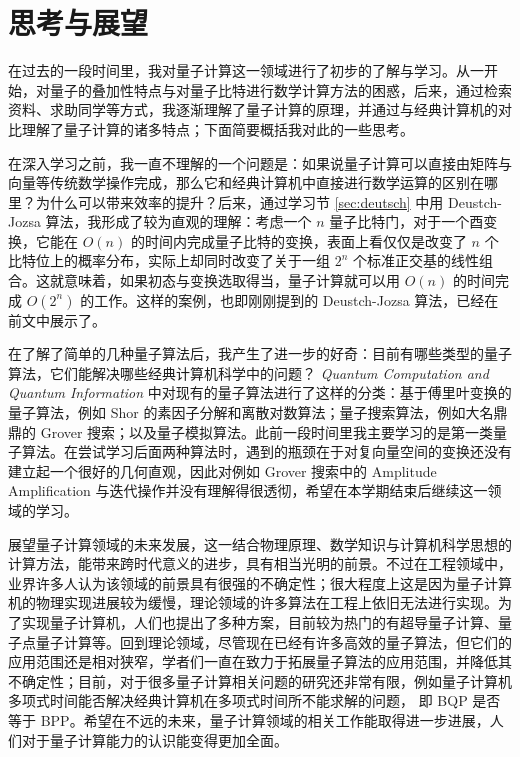 \section{思考与展望}

在过去的一段时间里，我对量子计算这一领域进行了初步的了解与学习。从一开始，对量子的叠加性特点与对量子比特进行数学计算方法的困惑，后来，通过检索资料、求助同学等方式，我逐渐理解了量子计算的原理，并通过与经典计算机的对比理解了量子计算的诸多特点；下面简要概括我对此的一些思考。

在深入学习之前，我一直不理解的一个问题是：如果说量子计算可以直接由矩阵与向量等传统数学操作完成，那么它和经典计算机中直接进行数学运算的区别在哪里？为什么可以带来效率的提升？后来，通过学习节 \ref{sec:deutsch} 中用 Deustch-Jozsa 算法，我形成了较为直观的理解：考虑一个 $n$ 量子比特门，对于一个酉变换，它能在 $O(n)$ 的时间内完成量子比特的变换，表面上看仅仅是改变了 $n$ 个比特位上的概率分布，实际上却同时改变了关于一组 $2^n$ 个标准正交基的线性组合。这就意味着，如果初态与变换选取得当，量子计算就可以用 $O(n)$ 的时间完成 $O(2^n)$ 的工作。这样的案例，也即刚刚提到的 Deustch-Jozsa 算法，已经在前文中展示了。

在了解了简单的几种量子算法后，我产生了进一步的好奇：目前有哪些类型的量子算法，它们能解决哪些经典计算机科学中的问题？\textit{ Quantum Computation and Quantum Information}\cite{nielsen2002quantum} 中对现有的量子算法进行了这样的分类：基于傅里叶变换的量子算法，例如 Shor 的素因子分解和离散对数算法；量子搜索算法，例如大名鼎鼎的 Grover 搜索；以及量子模拟算法。此前一段时间里我主要学习的是第一类量子算法。在尝试学习后面两种算法时，遇到的瓶颈在于对复向量空间的变换还没有建立起一个很好的几何直观，因此对例如 Grover 搜索中的 Amplitude Amplification 与迭代操作并没有理解得很透彻，希望在本学期结束后继续这一领域的学习。

展望量子计算领域的未来发展，这一结合物理原理、数学知识与计算机科学思想的计算方法，能带来跨时代意义的进步，具有相当光明的前景。不过在工程领域中，业界许多人认为该领域的前景具有很强的不确定性；很大程度上这是因为量子计算机的物理实现进展较为缓慢，理论领域的许多算法在工程上依旧无法进行实现。为了实现量子计算机，人们也提出了多种方案，目前较为热门的有超导量子计算、量子点量子计算等。回到理论领域，尽管现在已经有许多高效的量子算法，但它们的应用范围还是相对狭窄，学者们一直在致力于拓展量子算法的应用范围，并降低其不确定性；目前，对于很多量子计算相关问题的研究还非常有限\cite{孙晓明2016量子计算若干前沿问题综述}，例如量子计算机多项式时间能否解决经典计算机在多项式时间所不能求解的问题， 即 BQP 是否等于 BPP。希望在不远的未来，量子计算领域的相关工作能取得进一步进展，人们对于量子计算能力的认识能变得更加全面。
